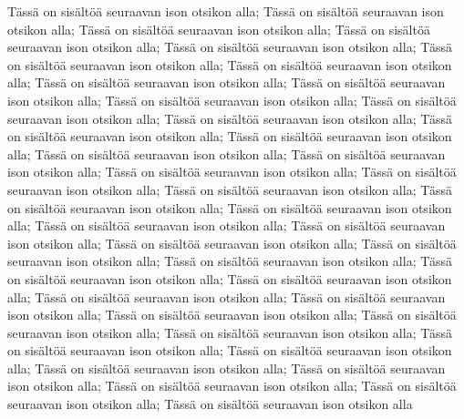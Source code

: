 \documentclass[a4paper]{article}
\begin{document}
Tässä on sisältöä seuraavan ison otsikon alla; Tässä on sisältöä seuraavan ison otsikon alla; Tässä on sisältöä seuraavan ison otsikon alla; Tässä on sisältöä seuraavan ison otsikon alla; Tässä on sisältöä seuraavan ison otsikon alla; Tässä on sisältöä seuraavan ison otsikon alla; Tässä on sisältöä seuraavan ison otsikon alla; Tässä on sisältöä seuraavan ison otsikon alla; Tässä on sisältöä seuraavan ison otsikon alla; Tässä on sisältöä seuraavan ison otsikon alla; Tässä on sisältöä seuraavan ison otsikon alla; Tässä on sisältöä seuraavan ison otsikon alla; Tässä on sisältöä seuraavan ison otsikon alla; Tässä on sisältöä seuraavan ison otsikon alla; Tässä on sisältöä seuraavan ison otsikon alla; Tässä on sisältöä seuraavan ison otsikon alla; Tässä on sisältöä seuraavan ison otsikon alla; Tässä on sisältöä seuraavan ison otsikon alla; Tässä on sisältöä seuraavan ison otsikon alla; Tässä on sisältöä seuraavan ison otsikon alla; Tässä on sisältöä seuraavan ison otsikon alla; Tässä on sisältöä seuraavan ison otsikon alla; Tässä on sisältöä seuraavan ison otsikon alla; Tässä on sisältöä seuraavan ison otsikon alla; Tässä on sisältöä seuraavan ison otsikon alla; Tässä on sisältöä seuraavan ison otsikon alla; Tässä on sisältöä seuraavan ison otsikon alla; Tässä on sisältöä seuraavan ison otsikon alla; Tässä on sisältöä seuraavan ison otsikon alla; Tässä on sisältöä seuraavan ison otsikon alla; Tässä on sisältöä seuraavan ison otsikon alla; Tässä on sisältöä seuraavan ison otsikon alla; Tässä on sisältöä seuraavan ison otsikon alla; Tässä on sisältöä seuraavan ison otsikon alla; Tässä on sisältöä seuraavan ison otsikon alla; Tässä on sisältöä seuraavan ison otsikon alla; Tässä on sisältöä seuraavan ison otsikon alla; Tässä on sisältöä seuraavan ison otsikon alla; Tässä on sisältöä seuraavan ison otsikon alla; Tässä on sisältöä seuraavan ison otsikon alla
\end{document}
